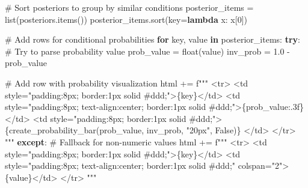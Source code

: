 \documentclass[
  11pt,
  letterpaper,
]{book}
\newenvironment{Shaded}{\begin{snugshade}}{\end{snugshade}}
\newcommand{\BuiltInTok}[1]{\textcolor[rgb]{0.00,0.23,0.31}{#1}}
\newcommand{\CommentTok}[1]{\textcolor[rgb]{0.37,0.37,0.37}{#1}}
\newcommand{\ControlFlowTok}[1]{\textcolor[rgb]{0.00,0.23,0.31}{\textbf{#1}}}
\newcommand{\DecValTok}[1]{\textcolor[rgb]{0.68,0.00,0.00}{#1}}
\newcommand{\FloatTok}[1]{\textcolor[rgb]{0.68,0.00,0.00}{#1}}
\newcommand{\KeywordTok}[1]{\textcolor[rgb]{0.00,0.23,0.31}{\textbf{#1}}}
\newcommand{\NormalTok}[1]{\textcolor[rgb]{0.00,0.23,0.31}{#1}}
\newcommand{\OperatorTok}[1]{\textcolor[rgb]{0.37,0.37,0.37}{#1}}
\newcommand{\SpecialCharTok}[1]{\textcolor[rgb]{0.37,0.37,0.37}{#1}}
\newcommand{\SpecialStringTok}[1]{\textcolor[rgb]{0.13,0.47,0.30}{#1}}
\newcommand{\StringTok}[1]{\textcolor[rgb]{0.13,0.47,0.30}{#1}}
\newcommand{\VariableTok}[1]{\textcolor[rgb]{0.07,0.07,0.07}{#1}}
\begin{document}
\begin{Shaded}
\begin{Highlighting}[]
        \CommentTok{\# Sort posteriors to group by similar conditions}
\NormalTok{        posterior\_items }\OperatorTok{=} \BuiltInTok{list}\NormalTok{(posteriors.items())}
\NormalTok{        posterior\_items.sort(key}\OperatorTok{=}\KeywordTok{lambda}\NormalTok{ x: x[}\DecValTok{0}\NormalTok{])}

        \CommentTok{\# Add rows for conditional probabilities}
        \ControlFlowTok{for}\NormalTok{ key, value }\KeywordTok{in}\NormalTok{ posterior\_items:}
            \ControlFlowTok{try}\NormalTok{:}
                \CommentTok{\# Try to parse probability value}
\NormalTok{                prob\_value }\OperatorTok{=} \BuiltInTok{float}\NormalTok{(value)}
\NormalTok{                inv\_prob }\OperatorTok{=} \FloatTok{1.0} \OperatorTok{{-}}\NormalTok{ prob\_value}

                \CommentTok{\# Add row with probability visualization}
\NormalTok{                html }\OperatorTok{+=} \SpecialStringTok{f"""}
\SpecialStringTok{                \textless{}tr\textgreater{}}
\SpecialStringTok{                    \textless{}td style="padding:8px; border:1px solid \#ddd;"\textgreater{}}\SpecialCharTok{\{}\NormalTok{key}\SpecialCharTok{\}}\SpecialStringTok{\textless{}/td\textgreater{}}
\SpecialStringTok{                    \textless{}td style="padding:8px; text{-}align:center; border:1px solid \#ddd;"\textgreater{}}\SpecialCharTok{\{}\NormalTok{prob\_value}\SpecialCharTok{:.3f\}}\SpecialStringTok{\textless{}/td\textgreater{}}
\SpecialStringTok{                    \textless{}td style="padding:8px; border:1px solid \#ddd;"\textgreater{}}
\SpecialStringTok{                        }\SpecialCharTok{\{}\NormalTok{create\_probability\_bar(prob\_value, inv\_prob, }\StringTok{"20px"}\NormalTok{, }\VariableTok{False}\NormalTok{)}\SpecialCharTok{\}}
\SpecialStringTok{                    \textless{}/td\textgreater{}}
\SpecialStringTok{                \textless{}/tr\textgreater{}}
\SpecialStringTok{                """}
            \ControlFlowTok{except}\NormalTok{:}
                \CommentTok{\# Fallback for non{-}numeric values}
\NormalTok{                html }\OperatorTok{+=} \SpecialStringTok{f"""}
\SpecialStringTok{                \textless{}tr\textgreater{}}
\SpecialStringTok{                    \textless{}td style="padding:8px; border:1px solid \#ddd;"\textgreater{}}\SpecialCharTok{\{}\NormalTok{key}\SpecialCharTok{\}}\SpecialStringTok{\textless{}/td\textgreater{}}
\SpecialStringTok{                    \textless{}td style="padding:8px; text{-}align:center; border:1px solid \#ddd;" colspan="2"\textgreater{}}\SpecialCharTok{\{}\NormalTok{value}\SpecialCharTok{\}}\SpecialStringTok{\textless{}/td\textgreater{}}
\SpecialStringTok{                \textless{}/tr\textgreater{}}
\SpecialStringTok{                """}


\end{Highlighting}
\end{Shaded}
\end{document}
